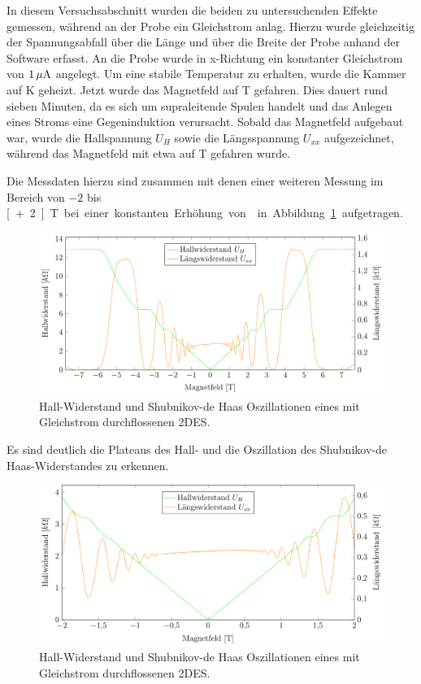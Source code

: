 
In diesem Versuchsabschnitt wurden die beiden zu untersuchenden Effekte gemessen, während an der Probe ein Gleichstrom anlag. Hierzu wurde gleichzeitig der Spannungsabfall über die Länge und über die Breite der Probe anhand der Software erfasst. An die Probe wurde in x-Richtung ein konstanter Gleichstrom von $\unit[1]{\mu A}$ angelegt. Um eine stabile Temperatur zu erhalten, wurde die Kammer auf \unit[2]{K} geheizt. Jetzt wurde das Magnetfeld auf \unit[-7]{T} gefahren. Dies dauert rund sieben Minuten, da es sich um supraleitende Spulen handelt und das Anlegen eines Stroms eine Gegeninduktion verursacht. Sobald das Magnetfeld aufgebaut war, wurde die Hallspannung $U_H$ sowie die Längsspannung $U_{xx}$ aufgezeichnet, während das Magnetfeld mit etwa  auf \unit[7]{T} gefahren wurde. 


Die Messdaten hierzu sind zusammen mit denen einer weiteren Messung im Bereich von $-2$ bis \unit[+2]{T} bei einer konstanten Erhöhung von  in Abbildung~\ref{fig:full_range_dc} aufgetragen.

\begin{figure}[h]
	\centering
	\includegraphics{graphs/dc/full_range.pdf}
	\caption[Gleichstrommessung im maximalen Magnetfeldbereich]{
		Hall-Widerstand und Shubnikov-de Haas Oszillationen eines mit Gleichstrom durchflossenen 2DES.
	}
	\label{fig:full_range_dc}
\end{figure}

Es sind deutlich die Plateaus des Hall- und die Oszillation des Shubnikov-de Haas-Widerstandes zu erkennen.


\begin{figure}[h]
	\centering
	\includegraphics{graphs/dc/pm2T_range.pdf}
	\caption[Höher aufgelöste Gleichstrommessung in Magnetfeldteilbereich]{
		Hall-Widerstand und Shubnikov-de Haas Oszillationen eines mit Gleichstrom durchflossenen 2DES.
	}
	\label{fig:2T_range_dc}
\end{figure}
